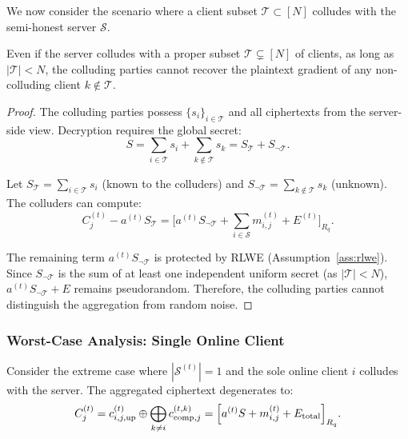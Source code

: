 We now consider the scenario where a client subset $\mathcal{T} \subset [N]$ colludes with the semi-honest server $\mathcal{S}$.

\begin{theorem}
\label{thm:partial-collusion}
Even if the server colludes with a proper subset $\mathcal{T} \subsetneq [N]$ of clients, as long as $|\mathcal{T}| < N$, the colluding parties cannot recover the plaintext gradient of any non-colluding client $k \notin \mathcal{T}$.
\end{theorem}

\begin{proof}
The colluding parties possess $\{s_i\}_{i \in \mathcal{T}}$ and all ciphertexts from the server-side view. Decryption requires the global secret:
\begin{equation}
    S = \sum_{i \in \mathcal{T}} s_i + \sum_{k \notin \mathcal{T}} s_k = S_{\mathcal{T}} + S_{\neg\mathcal{T}}.
\end{equation}

Let $S_{\mathcal{T}} = \sum_{i \in \mathcal{T}} s_i$ (known to the colluders) and $S_{\neg\mathcal{T}} = \sum_{k \notin \mathcal{T}} s_k$ (unknown). The colluders can compute:
\begin{equation}
    C_j^{(t)} - a^{(t)} S_{\mathcal{T}} = \bigl[ a^{(t)} S_{\neg\mathcal{T}} + \sum_{i \in \mathcal{S}} m_{i,j}^{(t)} + E^{(t)} \bigr]_{R_q}.
\end{equation}

The remaining term $a^{(t)} S_{\neg\mathcal{T}}$ is protected by RLWE (Assumption~\ref{ass:rlwe}). Since $S_{\neg\mathcal{T}}$ is the sum of at least one independent uniform secret (as $|\mathcal{T}| < N$), $a^{(t)} S_{\neg\mathcal{T}} + E$ remains pseudorandom. Therefore, the colluding parties cannot distinguish the aggregation from random noise.
\end{proof}

\subsubsection{Worst-Case Analysis: Single Online Client}

Consider the extreme case where $|\mathcal{S}^{(t)}| = 1$ and the sole online client $i$ colludes with the server. The aggregated ciphertext degenerates to:
\begin{equation}
    C_j^{(t)} = c_{i,j,\mathrm{up}}^{(t)} \oplus \bigoplus_{k \neq i} c_{\mathrm{comp},j}^{(t,k)} = \Bigl[ a^{(t)} S + m_{i,j}^{(t)} + E_{\mathrm{total}} \Bigr]_{R_q}.
\end{equation}

